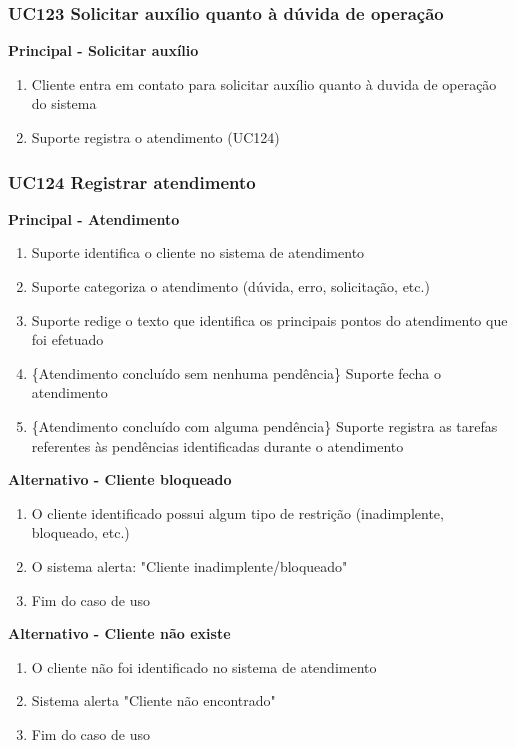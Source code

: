 \subsubsection{UC123 Solicitar auxílio quanto à dúvida de operação}

\textbf{Principal - Solicitar auxílio}

\begin{enumerate}
\item Cliente entra em contato para solicitar auxílio quanto à duvida de operação do sistema
\item Suporte registra o atendimento (UC124)
\end{enumerate}

\subsubsection{UC124 Registrar atendimento}

\textbf{Principal - Atendimento}

\begin{enumerate}
\item Suporte identifica o cliente no sistema de atendimento
\item Suporte categoriza o atendimento (dúvida, erro, solicitação, etc.)
\item Suporte redige o texto que identifica os principais pontos do atendimento que foi efetuado
\item \{Atendimento concluído sem nenhuma pendência\} Suporte fecha o atendimento
\item \{Atendimento concluído com alguma pendência\} Suporte registra as tarefas referentes às pendências identificadas durante o atendimento
\end{enumerate}

\textbf{Alternativo - Cliente bloqueado}

\begin{enumerate}
\item O cliente identificado possui algum tipo de restrição (inadimplente, bloqueado, etc.)
\item O sistema alerta:  "Cliente inadimplente/bloqueado"
\item Fim do caso de uso
\end{enumerate}

\textbf{Alternativo - Cliente não existe}

\begin{enumerate}
\item O cliente não foi identificado no sistema de atendimento
\item Sistema alerta  "Cliente não encontrado"
\item Fim do caso de uso
\end{enumerate}

